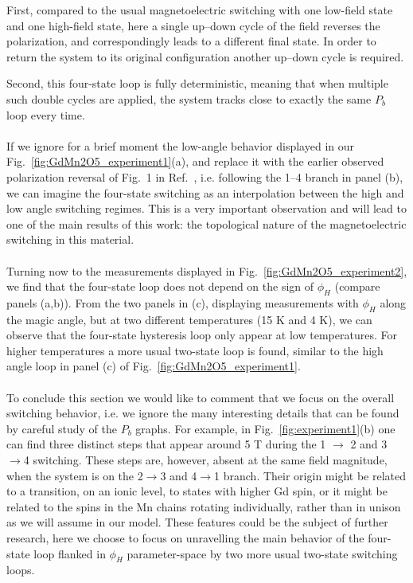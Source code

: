 First, compared to the usual magnetoelectric switching with one low-field state and one high-field state, here a single up--down cycle of the field reverses the polarization, and correspondingly leads to a different final state.
In order to return the system to its original configuration another up--down cycle is required.

Second, this four-state loop is fully deterministic, meaning that when multiple such double cycles are applied, the system tracks close to exactly the same $P_b$ loop every time.
\\\\
If we ignore for a brief moment the low-angle behavior displayed in our Fig.~\ref{fig:GdMn2O5_experiment1}(a), and replace it with the earlier observed polarization reversal of Fig.~1 in Ref.~\cite{Lee13}, i.e. following the 1--4 branch in panel (b), we can imagine the four-state switching as an interpolation between the high and low angle switching regimes.
This is a very important observation and will lead to one of the main results of this work: the topological nature of the magnetoelectric switching in this material.
\\\\
Turning now to the measurements displayed in Fig.~\ref{fig:GdMn2O5_experiment2}, we find that the four-state loop does not depend on the sign of $\phi_H$ (compare panels (a,b)).
From the two panels in (c), displaying measurements with $\phi_H$ along the magic angle, but at two different temperatures (15 K and 4 K), we can observe that the four-state hysteresis loop only appear at low temperatures.
For higher temperatures a more usual two-state loop is found, similar to the high angle loop in panel (c) of Fig.~\ref{fig:GdMn2O5_experiment1}.
\\\\
To conclude this section we would like to comment that we focus on the overall switching behavior, i.e. we ignore the many interesting details that can be found by careful study of the $P_b$ graphs.
For example, in Fig.~\ref{fig:experiment1}(b) one can find three distinct steps that appear around 5 T during the 1 $\rightarrow$ 2 and 3 $\rightarrow$4 switching.
These steps are, however, absent at the same field magnitude, when the system is on the 2$\rightarrow$3 and 4$\rightarrow$1 branch.
Their origin might be related to a transition, on an ionic level, to states with higher Gd spin, or it might be related to the spins in the Mn chains rotating individually, rather than in unison as we will assume in our model.
These features could be the subject of further research, here we choose to focus on unravelling the main behavior of the four-state loop flanked in $\phi_H$ parameter-space by two more usual two-state switching loops.

